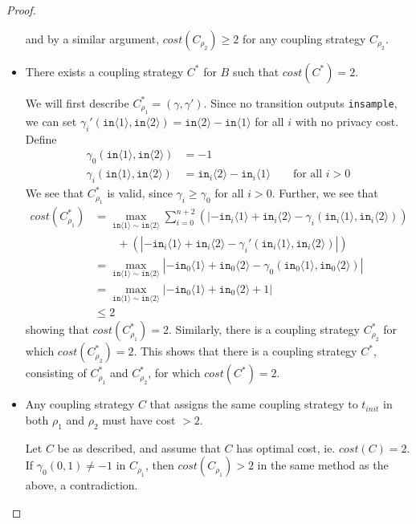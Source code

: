 \documentclass[12pt]{article}
\newcommand{\brangle}[1]{\langle#1 \rangle}
\theoremstyle{definition}
\begin{document}
\begin{proof}
\begin{itemize}
    and by a similar argument, $cost(C_{\rho_2})\geq 2$ for any coupling strategy $C_{\rho_2}$.

    \item There exists a coupling strategy $C^*$ for $B$ such that $cost(C^*) = 2$.
    
    We will first describe $C_{\rho_1}^* = (\gamma, \gamma')$. Since no transition outputs \texttt{insample}, we can set $\gamma_i'(\texttt{in}\brangle{1}, \texttt{in}\brangle{2}) = \texttt{in}\brangle{2} - \texttt{in}\brangle{1}$ for all $i$ with no privacy cost. Define 
    \begin{align*}
        \gamma_0(\texttt{in}\brangle{1}, \texttt{in}\brangle{2}) &= -1 \\
        \gamma_i(\texttt{in}\brangle{1}, \texttt{in}\brangle{2}) &= \texttt{in}_i\brangle{2} - \texttt{in}_i\brangle{1} \qquad \text{for all $i>0$}
    \end{align*}
    We see that $C^*_{\rho_1}$ is valid, since $\gamma_i\geq \gamma_{0}$ for all $i>0$. Further, we see that 
    \begin{align*}
        cost(C^*_{\rho_1}) &= \max_{\texttt{in}\brangle{1}\sim\texttt{in}\brangle{2}}\sum_{i=0}^{n+2}(|-\texttt{in}_i\brangle{1}+\texttt{in}_i\brangle{2}-\gamma_i(\texttt{in}_i\brangle{1}, \texttt{in}_i\brangle{2}))\\&\qquad+(|-\texttt{in}_i\brangle{1}+\texttt{in}_i\brangle{2}-\gamma_i'(\texttt{in}_i\brangle{1}, \texttt{in}_i\brangle{2})|)\\
        &= \max_{\texttt{in}\brangle{1}\sim\texttt{in}\brangle{2}} |-\texttt{in}_0\brangle{1}+\texttt{in}_0\brangle{2}-\gamma_0(\texttt{in}_0\brangle{1}, \texttt{in}_0\brangle{2})| \\
        &= \max_{\texttt{in}\brangle{1}\sim\texttt{in}\brangle{2}} |-\texttt{in}_0\brangle{1}+\texttt{in}_0\brangle{2}+1|\\
        &\leq 2 
    \end{align*}
    showing that $cost(C^*_{\rho_1}) = 2$. Similarly, there is a coupling strategy $C^*_{\rho_2}$ for which $cost(C^*_{\rho_2}) = 2$. This shows that there is a coupling strategy $C^*$, consisting of $C^*_{\rho_1}$ and $C^*_{\rho_2}$, for which $cost(C^*) = 2$.
    
    \item Any coupling strategy $C$ that assigns the same coupling strategy to $t_{init}$ in both $\rho_1$ and $\rho_2$ must have cost $>2$.
    
    Let $C$ be as described, and assume that $C$ has optimal cost, ie. $cost(C) = 2$. If $\gamma_0(0, 1) \neq -1$ in $C_{\rho_1}$, then $cost(C_{\rho_1}) > 2$ in the same method as the above, a contradiction.  


\end{itemize}
\end{proof}
\end{document}
